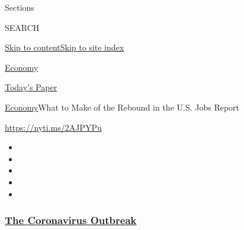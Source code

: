 Sections

SEARCH

\protect\hyperlink{site-content}{Skip to
content}\protect\hyperlink{site-index}{Skip to site index}

\href{https://www.nytimes3xbfgragh.onion/section/business/economy}{Economy}

\href{https://myaccount.nytimes3xbfgragh.onion/auth/login?response_type=cookie\&client_id=vi}{}

\href{https://www.nytimes3xbfgragh.onion/section/todayspaper}{Today's
Paper}

\href{/section/business/economy}{Economy}\textbar{}What to Make of the
Rebound in the U.S. Jobs Report

\url{https://nyti.ms/2AJPYPu}

\begin{itemize}
\item
\item
\item
\item
\item
\end{itemize}

\hypertarget{the-coronavirus-outbreak}{%
\subsubsection{\texorpdfstring{\href{https://www.nytimes3xbfgragh.onion/news-event/coronavirus?name=styln-coronavirus-markets\&region=TOP_BANNER\&variant=undefined\&block=storyline_menu_recirc\&action=click\&pgtype=Article\&impression_id=2b343a20-e385-11ea-b0af-051312a80ef8}{The
Coronavirus
Outbreak}}{The Coronavirus Outbreak}}\label{the-coronavirus-outbreak}}

